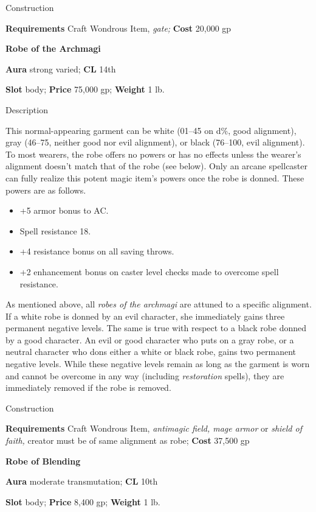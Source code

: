 Construction
				
\textbf{Requirements} Craft Wondrous Item,\textit{ gate;}\textbf{ Cost }20,000 gp
				
\textbf{Robe of the Archmagi}
				
\textbf{Aura} strong varied;\textbf{ CL }14th
				
\textbf{Slot} body; \textbf{Price} 75,000 gp; \textbf{Weight} 1 lb.
				
Description
				
This normal-appearing garment can be white (01--45 on d\%, good alignment), gray (46--75, neither good nor evil alignment), or black (76--100, evil alignment). To most wearers, the robe offers no powers or has no effects unless the wearer's alignment doesn't match that of the robe (see below). Only an arcane spellcaster can fully realize this potent magic item's powers once the robe is donned. These powers are as follows.
				\begin{itemize}\item  +5 armor bonus to AC.
				\item  Spell resistance 18.
				\item  +4 resistance bonus on all saving throws.
				\item  +2 enhancement bonus on caster level checks made to overcome spell resistance.
\end{itemize}
				
As mentioned above, all \textit{robes of the archmagi} are attuned to a specific alignment. If a white robe is donned by an evil character, she immediately gains three permanent negative levels. The same is true with respect to a black robe donned by a good character. An evil or good character who puts on a gray robe, or a neutral character who dons either a white or black robe, gains two permanent negative levels. While these negative levels remain as long as the garment is worn and cannot be overcome in any way (including \textit{restoration} spells), they are immediately removed if the robe is removed. 
				
Construction
				
\textbf{Requirements} Craft Wondrous Item, \textit{antimagic field, mage armor }or\textit{ shield of faith, }creator must be of same alignment as robe;\textbf{ Cost }37,500 gp
				
\textbf{Robe of Blending}
				
\textbf{Aura} moderate transmutation;\textbf{ CL }10th
				
\textbf{Slot} body; \textbf{Price} 8,400 gp; \textbf{Weight} 1 lb.
				
